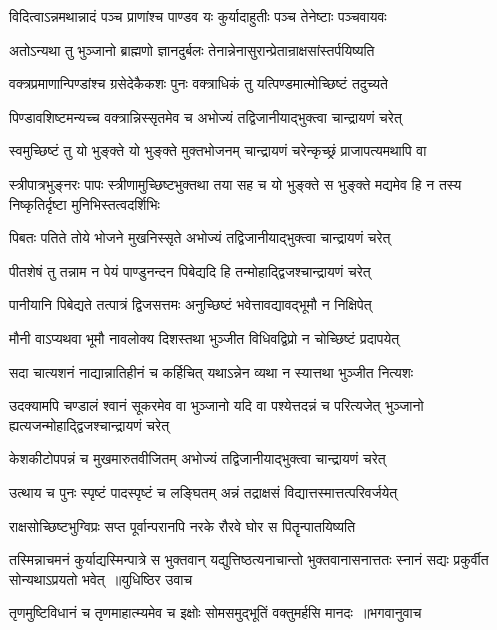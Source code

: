 \twolineshloka
{विदित्वाऽन्नमथान्नादं पञ्च प्राणांश्च पाण्डव}
{यः कुर्यादाहुतीः पञ्च तेनेष्टाः पञ्चवायवः}


\twolineshloka
{अतोऽन्यथा तु भुञ्जानो ब्राह्मणो ज्ञानदुर्बलः}
{तेनान्नेनासुरान्प्रेतान्राक्षसांस्तर्पयिष्यति}


\twolineshloka
{वक्त्रप्रमाणान्पिण्डांश्च ग्रसेदेकैकशः पुनः}
{वक्त्राधिकं तु यत्पिण्डमात्मोच्छिष्टं तदुच्यते}


\twolineshloka
{पिण्डावशिष्टमन्यच्च वक्त्रान्निस्सृतमेव च}
{अभोज्यं तद्विजानीयाद्भुक्त्वा चान्द्रायणं चरेत्}


\twolineshloka
{स्वमुच्छिष्टं तु यो भुङ्क्ते यो भुङ्क्ते मुक्तभोजनम्}
{चान्द्रायणं चरेन्कृच्छ्रं प्राजापत्यमथापि वा}


\threelineshloka
{स्त्रीपात्रभुङ्नरः पापः स्त्रीणामुच्छिष्टभुक्तथा}
{तया सह च यो भुङ्क्ते स भुङ्क्ते मद्यमेव हि}
{न तस्य निष्कृतिर्दृष्टा मुनिभिस्तत्वदर्शिभिः}


\twolineshloka
{पिबतः पतिते तोये भोजने मुखनिस्सृते}
{अभोज्यं तद्विजानीयाद्भुक्त्वा चान्द्रायणं चरेत्}


\twolineshloka
{पीतशेषं तु तन्नाम न पेयं पाण्डुनन्दन}
{पिबेद्यदि हि तन्मोहाद्द्विजश्चान्द्रायणं चरेत्}


\twolineshloka
{पानीयानि पिबेद्यते तत्पात्रं द्विजसत्तमः}
{अनुच्छिष्टं भवेत्तावद्यावद्भूमौ न निक्षिपेत्}


\twolineshloka
{मौनी वाऽप्यथवा भूमौ नावलोक्य दिशस्तथा}
{भुञ्जीत विधिवद्विप्रो न चोच्छिष्टं प्रदापयेत्}


\twolineshloka
{सदा चात्यशनं नाद्यान्नातिहीनं च कर्हिचित्}
{यथाऽन्नेन व्यथा न स्यात्तथा भुञ्जीत नित्यशः}


\threelineshloka
{उदक्यामपि चण्डालं श्वानं सूकरमेव वा}
{भुञ्जानो यदि वा पश्येत्तदन्नं च परित्यजेत्}
{भुञ्जानो ह्यत्यजन्मोहाद्द्विजश्चान्द्रायणं चरेत्}


\twolineshloka
{केशकीटोपपन्नं च मुखमारुतवीजितम्}
{अभोज्यं तद्विजानीयाद्भुक्त्वा चान्द्रायणं चरेत्}


\twolineshloka
{उत्थाय च पुनः स्पृष्टं पादस्पृष्टं च लङ्घितम्}
{अन्नं तद्राक्षसं विद्यात्तस्मात्तत्परिवर्जयेत्}


\twolineshloka
{राक्षसोच्छिष्टभुग्विप्रः सप्त पूर्वान्परानपि}
{नरके रौरवे घोर स पितॄन्पातयिष्यति}


\fourlineindentedshloka
{तस्मिन्नाचमनं कुर्याद्यस्मिन्पात्रे स भुक्तवान्}
{यद्युत्तिष्ठत्यनाचान्तो भुक्तवानासनात्ततः}
{स्नानं सद्यः प्रकुर्वीत सोन्यथाऽप्रयतो भवेत् ॥युधिष्ठिर उवाच}
{}


\threelineshloka
{तृणमुष्टिविधानं च तृणमाहात्म्यमेव च}
{इक्षोः सोमसमुद्भूतिं वक्तुमर्हसि मानदः ॥भगवानुवाच}
{}


